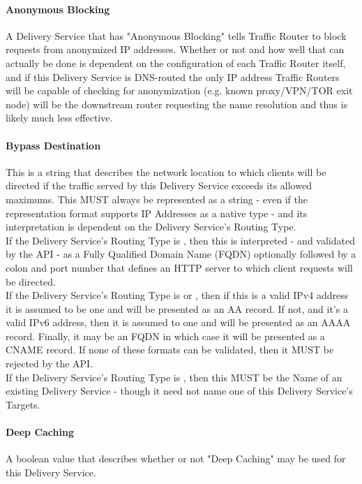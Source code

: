 \paragraph{Anonymous Blocking}
A Delivery Service that has "Anonymous Blocking" tells Traffic Router to block
requests from anonymized IP addresses. Whether or not and how well that can
actually be done is dependent on the configuration of each Traffic Router
itself, and if this Delivery Service is DNS-routed the only IP address Traffic
Routers will be capable of checking for anonymization (e.g. known proxy/VPN/TOR
exit node) will be the downstream router requesting the name resolution and thus
is likely much less effective.

\paragraph{Bypass Destination}
This is a string that describes the network location to which clients will be
directed if the traffic served by this Delivery Service exceeds its allowed
maximums. This MUST always be represented as a string - even if the
representation format supports IP Addresses as a native type - and its
interpretation is dependent on the Delivery Service's Routing Type.\\
If the Delivery Service's Routing Type is , then this is interpreted
- and validated by the API - as a Fully Qualified Domain Name (FQDN) optionally
followed by a colon and port number that defines an HTTP server to which client
requests will be directed.\\
If the Delivery Service's Routing Type is  or , then if
this is a valid IPv4 address it is assumed to be one and will be presented as an
AA record. If not, and it's a valid IPv6 address, then it is assumed to one and
will be presented as an AAAA record. Finally, it may be an FQDN in which case it
will be presented as a CNAME record. If none of these formats can be validated,
then it MUST be rejected by the API.\\
If the Delivery Service's Routing Type is , then this MUST be the
Name of an existing Delivery Service - though it need not name one of this
Delivery Service's Targets.

\paragraph{Deep Caching}
A boolean value that describes whether or not "Deep Caching" may be used for
this Delivery Service.

